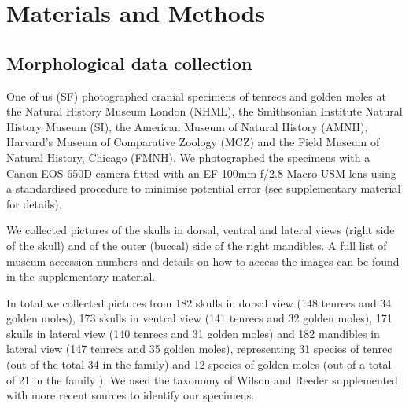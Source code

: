 \documentclass[12pt,a4paper]{article}
\begin{document}
\section{Materials and Methods}

\subsection{Morphological data collection} 

	
	One of us (SF) photographed cranial specimens of tenrecs and golden moles at the Natural History Museum London (NHML), the Smithsonian Institute Natural History Museum (SI), the American Museum of Natural History (AMNH), Harvard's Museum of Comparative Zoology (MCZ) and the Field Museum of Natural History, Chicago (FMNH). We photographed the specimens with a Canon EOS 650D camera fitted with an EF 100mm f/2.8 Macro USM lens using a standardised procedure to minimise potential error (see supplementary material for details). 

	We collected pictures of the skulls in dorsal, ventral and lateral views (right side of the skull) and of the outer (buccal) side of the right mandibles. A full list of museum accession numbers and details on how to access the images can be found in the supplementary material.

	In total we collected pictures from 182 skulls in dorsal view (148 tenrecs and 34 golden moles), 173 skulls in ventral view (141 tenrecs and 32 golden moles), 171 skulls in lateral view (140 tenrecs and 31 golden moles) and 182 mandibles in lateral view (147 tenrecs and 35 golden moles), representing 31 species of tenrec (out of the total 34 in the family) and 12 species of golden moles (out of a total of 21 in the family \citep{Asher2010}). %
	We used the taxonomy of Wilson and Reeder \citeyearpar{Wilson2005} supplemented with more recent sources \citep{IUCN2012, Olson2013} to identify our specimens. 
	
\end{document}
